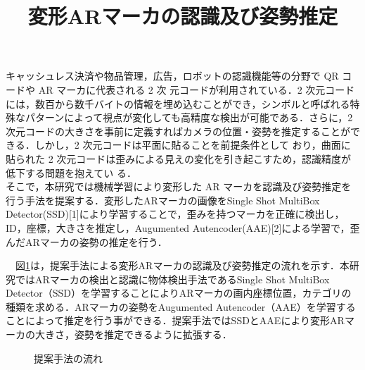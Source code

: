 \documentclass{jsarticle}
\title{変形ARマーカの認識及び姿勢推定}
\begin{document}
\maketitle

キャッシュレス決済や物品管理，広告，ロボットの認識機能等の分野で QR コードや AR マーカに代表される 2 次
元コードが利用されている．2 次元コードには，数百から数千バイトの情報を埋め込むことができ，シンボルと呼ばれる特殊なパターンによって視点が変化しても高精度な検出が可能である．さらに，2 次元コードの大きさを事前に定義すればカメラの位置・姿勢を推定することができる．しかし，2 次元コードは平面に貼ることを前提条件として
おり，曲面に貼られた 2 次元コードは歪みによる見えの変化を引き起こすため，認識精度が低下する問題を抱えてい
る．
\\そこで，本研究では機械学習により変形した AR マーカを認識及び姿勢推定を行う手法を提案する．変形したARマーカの画像をSingle Shot MultiBox Detector(SSD)[1]により学習することで，歪みを持つマーカを正確に検出し，ID，座標，大きさを推定し，Augumented Autencoder(AAE)[2]による学習で，歪んだARマーカの姿勢の推定を行う．


　図\ref{flow}は，提案手法による変形ARマーカの認識及び姿勢推定の流れを示す．本研究ではARマーカの検出と認識に物体検出手法であるSingle Shot MultiBox Detector（SSD）を学習することによりARマーカの画内座標位置，カテゴリの種類を求める．ARマーカの姿勢をAugumented Autencoder（AAE）を学習することによって推定を行う事ができる．提案手法ではSSDとAAEにより変形ARマーカの大きさ，姿勢を推定できるように拡張する．

\begin{figure}[ht]
\vspace{-4zh}
\setlength{\epsfxsize}{7.5cm}
\centerline{}
\vspace{3zh}
\caption{提案手法の流れ}
\label{flow}
\vspace{-1.0zh}
\end{figure}
\end{document}
